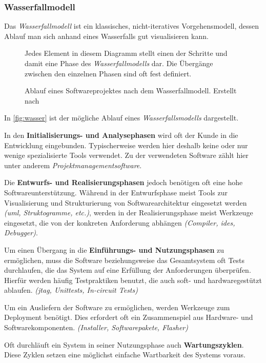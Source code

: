 \subsubsection*{Wasserfallmodell}
Das \emph{Wasserfallmodell} ist ein klassisches, nicht-iteratives
Vorgehensmodell, dessen Ablauf man sich anhand eines Wasserfalls gut visualisieren kann. 

\begin{figure}[!ht]
\centering
\def\svgwidth{\columnwidth}

\caption{Ablauf eines Softwareprojektes nach dem Wasserfallmodell. Erstellt nach
\cite{WP01}}{Jedes Element in diesem Diagramm stellt einen der Schritte und
damit eine Phase des \emph{Wasserfallmodells} dar. Die Übergänge zwischen den
einzelnen Phasen sind oft fest definiert.}
\label{fig:wasser}
\end{figure}

In \autoref{fig:wasser} ist der mögliche Ablauf eines \emph{Wasserfallsmodells}
dargestellt.

In den \textbf{Initialisierungs- und Analysephasen} wird oft der Kunde in die
Entwicklung eingebunden. Typischerweise werden hier deshalb keine oder nur
wenige spezialisierte Tools verwendet. Zu der verwendeten Software zählt hier
unter anderem \emph{Projektmanagementsoftware}.

Die \textbf{Entwurfs- und Realisierungsphasen} jedoch benötigen oft eine hohe
Softwareunterstützung. Während in der Entwurfsphase meist Tools zur
Visualisierung und Strukturierung von Softwarearchitektur eingesetzt werden
\emph{(\gls{uml}, Struktogramme, etc.)}, werden in der Realisierungsphase
meist Werkzeuge eingesetzt, die von der konkreten Anforderung abhängen
\emph{(Compiler, \glspl{ide}, Debugger)}.

Um einen Übergang in die \textbf{Einführungs- und Nutzungsphasen} zu
ermöglichen, muss die Software beziehungsweise das Gesamtsystem oft Tests durchlaufen, die das
System auf eine Erfüllung der Anforderungen überprüfen. Hierfür werden
häufig Testpraktiken benutzt, die auch soft- und hardwaregestützt
ablaufen. \emph{(\gls{jtag}, Unittests, In-circuit Tests)}

Um ein Ausliefern der Software zu ermöglichen, werden Werkzeuge zum Deployment
benötigt. Dies erfordert oft ein Zusammenspiel aus Hardware-
und Softwarekomponenten. \emph{(Installer, Softwarepakete, Flasher)}

Oft durchläuft ein System in seiner Nutzungsphase auch \textbf{Wartungszyklen}.
Diese Zyklen setzen eine möglichst einfache Wartbarkeit des Systems voraus.

